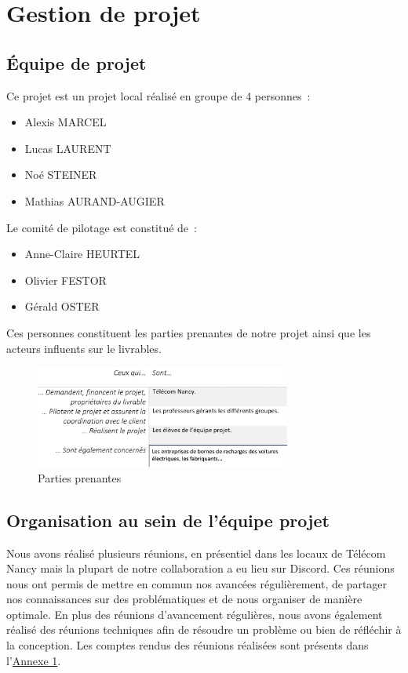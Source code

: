 \documentclass[french,a4paper]{article}
\begin{document}
\section{Gestion de projet}
\subsection{Équipe de projet}
Ce projet est un projet local réalisé en groupe de 4 personnes~:
\begin{itemize} 
    \item Alexis MARCEL
    \item Lucas LAURENT
    \item Noé STEINER
    \item Mathias AURAND-AUGIER
\end{itemize}
Le comité de pilotage est constitué de~:
\begin{itemize}
    \item Anne-Claire HEURTEL
    \item Olivier FESTOR
    \item Gérald OSTER
\end{itemize}
Ces personnes constituent les parties prenantes de notre projet ainsi que les acteurs influents sur le livrables.
\begin{figure}[H]
    \centering
    \includegraphics[width=0.75\textwidth]{img/parties_prenantes.png}
    \caption{Parties prenantes}
\end{figure}
\subsection{Organisation au sein de l’équipe projet}
Nous avons réalisé plusieurs réunions, en présentiel dans les locaux de Télécom Nancy mais la plupart de notre collaboration a eu lieu sur Discord. Ces réunions nous ont permis de mettre en commun nos avancées régulièrement, de partager nos connaissances sur des problématiques et de nous organiser de manière optimale.
En plus des réunions d'avancement régulières, nous avons également réalisé des réunions techniques afin de résoudre un problème ou bien de réfléchir à la conception.
Les comptes rendus des réunions réalisées sont présents dans l’\hyperlink{annexe1}{Annexe 1}.
\end{document}
